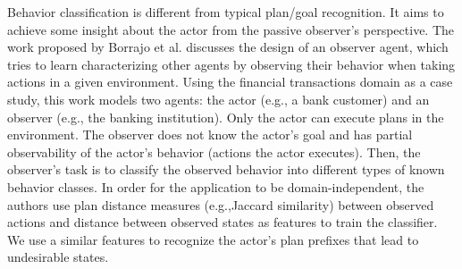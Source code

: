 Behavior classification is different from typical plan/goal recognition. It aims to achieve some insight about the actor from the passive observer's perspective. The work proposed by Borrajo et al. \citeyear{borrajo2020domainindependent} discusses the design of an observer agent, which tries to learn characterizing other agents by observing their behavior when taking actions in a given environment. Using the financial transactions domain as a case study, this work models two agents: the actor (e.g., a bank customer) and an observer (e.g., the banking institution). Only the actor can execute plans in the environment. The observer does not know the actor's goal and has partial observability of the actor's behavior (actions the actor executes). Then, the observer's task is to classify the observed behavior into different types of known behavior classes. In order for the application to be domain-independent, the authors use plan distance measures (e.g.,Jaccard similarity) between observed actions and distance between observed states as features to train the classifier. We use a similar features to recognize the actor's plan prefixes that lead to undesirable states.

